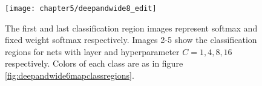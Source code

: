 \begin{figure}[ht]
	\centering
	\texttt{[image: chapter5/deepandwide8\_edit]}
	\caption[Classification regions for RS GMM nets with large $C$]{ The first and last classification region images represent softmax and fixed weight softmax respectively.  Images 2-5 show the classification regions for nets with \RS layer and hyperparameter \( C = 1,4,8,16 \) respectively. Colors of each class are as in figure \ref{fig:deepandwide6mapclassregions}.}
	\label{fig:deepandwide8}
\end{figure}

\FloatBarrier